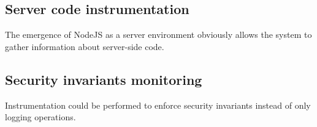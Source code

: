 \subsection{Server code instrumentation}

The emergence of NodeJS as a server environment obviously allows the system to
gather information about server-side code.

\subsection{Security invariants monitoring}

Instrumentation could be performed to enforce security invariants instead of
only logging operations. 
